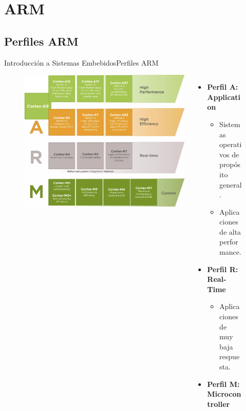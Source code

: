 \documentclass[aspectratio=169, xcolor=dvipsnames]{beamer}
\begin{document}
\section{ARM}
\subsection{Perfiles ARM}
\begin{frame}{Introducción a Sistemas Embebidos}{Perfiles ARM}
\begin{figure}
\begin{columns}
    \begin{column}{0.5\textwidth}
        \centering
        \includegraphics[width=0.8\linewidth]{resources/images/arm_profiles.png}
    \end{column}
    \begin{column}{0.5\textwidth}
        \begin{itemize}
            \item \textbf{Perfil A: Application}
                \begin{itemize}
                    \item Sistemas operativos de propósito general.
                    \item Aplicaciones de alta performance.
                \end{itemize}
            \item \textbf{Perfil R: Real-Time}
                \begin{itemize}
                    \item Aplicaciones de muy baja respuesta.
                \end{itemize}
            \item \textbf{Perfil M: Microcontroller}

\end{itemize}
\end{column}
\end{columns}
\end{figure}
\end{frame}
\end{document}
